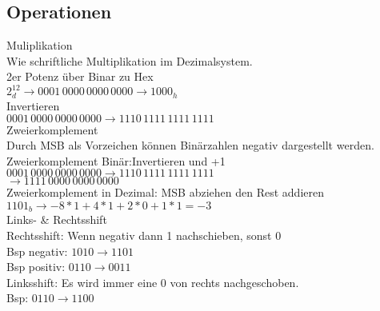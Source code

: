 \subsection{Operationen}
\textcolor{myblue}{Muliplikation}\\
Wie schriftliche Multiplikation im Dezimalsystem.\\
\textcolor{myblue}{2er Potenz über Binar zu Hex}\\
$2^{12}_d\rightarrow 0001 \,  0000 \, 0000 \, 0000 \rightarrow 1000_h$\\
\textcolor{myblue}{Invertieren}\\
$0001 \,  0000 \, 0000 \, 0000 \rightarrow 1110 \, 1111 \, 1111 \, 1111 \,$\\
\textcolor{myblue}{Zweierkomplement}\\
Durch MSB als Vorzeichen können Binärzahlen negativ dargestellt werden.\\
\textcolor{myblue}{Zweierkomplement Binär}:Invertieren und +1\\
$0001 \,  0000 \, 0000 \, 0000 \rightarrow 1110 \, 1111 \, 1111 \, 1111$\\
$\rightarrow 1111 \, 0000 \, 0000 \, 0000$\\
\textcolor{myblue}{Zweierkomplement in Dezimal}: MSB abziehen den Rest addieren\\
$1101_b \rightarrow -8*1+4*1+2*0+1*1 = -3$\\
\textcolor{myblue}{Links- \& Rechtsshift}\\
\textcolor{myblue}{Rechtsshift}: Wenn negativ dann 1 nachschieben, sonst 0\\
Bsp negativ: $1010 \rightarrow 1101$\\
Bsp positiv: $0110 \rightarrow 0011$\\
\textcolor{myblue}{Linksshift}: Es wird immer eine 0 von rechts nachgeschoben.\\
Bsp:  $0110 \rightarrow 1100$\\
